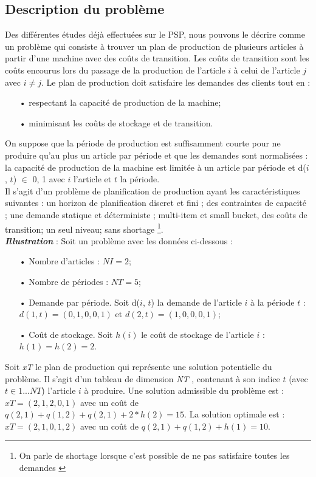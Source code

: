 	\subsection{Description du problème}{\label{sec:problem_description}}

		Des différentes études \cite{ratheil_master} \cite{ceschia} déjà effectuées sur le PSP, nous pouvons le décrire comme un problème qui consiste à trouver un plan de production de plusieurs articles à partir d’une machine avec des coûts de transition. Les coûts de transition sont les coûts encourus lors du passage de la production de l’article $i$ à celui de l’article $j$ avec $i \neq j$. Le plan de production doit satisfaire les demandes des clients tout en :
	\begin{itemize}
		\item[•] respectant la capacité de production de la machine;
		\item[•] minimisant les coûts de stockage et de transition.
	\end{itemize}
	\hspace*{.5cm} On suppose que la période de production est suffisamment courte pour ne produire qu’au plus un article par période et que les demandes sont normalisées : la capacité de production de la machine est limitée à un article par
période et d($i$, $t$) $ \in $ {0, 1} avec $i$ l’article et $t$ la période.\\
	\hspace*{.5cm} Il s’agit d’un problème de planification de production ayant les caractéristiques suivantes : un horizon de planification discret et fini ; des contraintes de capacité ; une demande statique et déterministe ; multi-item et small bucket, des coûts de transition; un seul niveau; sans shortage \footnote{On parle de shortage lorsque c'est possible de ne pas satisfaire toutes les demandes \cite{ratheil_master}}.\\

	\textbf{\textsl{Illustration}} : Soit un problème avec les données ci-dessous : \\
	\begin{itemize}
		\item[•] Nombre d’articles : $NI = 2$;
		\item[•] Nombre de périodes : $NT = 5$;
		\item[•] Demande par période. Soit d($i$, $t$) la demande de l’article $i$ à la période $t$ : $d(1, t) = (0, 1, 0, 0, 1)$ et $d(2, t) = (1, 0, 0, 0, 1)$;
		\item[•] Coût de stockage. Soit $h(i)$ le coût de stockage de l’article $i$ : $h(1) = h(2) = 2$.
	\end{itemize}
	Soit \emph{xT} le plan de production qui représente une solution potentielle du problème. Il s’agit d’un tableau de dimension \emph{NT} , contenant à son indice $t$ (avec $t  \in  {1...NT}$) l’article $i$ à produire. Une solution admissible du problème est : $ xT = (2, 1, 2, 0, 1)$ avec un coût de $ q(2, 1) + q(1, 2) + q(2, 1) + 2 * h(2) = 15 $. La solution optimale est : $ xT = (2, 1, 0, 1, 2)$ avec un coût de $q(2, 1) + q(1, 2) + h(1) = 10$.
		
